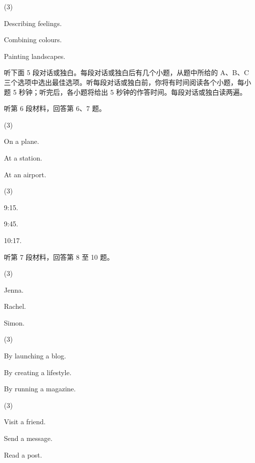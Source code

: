 \documentclass{英语试卷}
\begin{document}
\begin{choices}(3)
  \item Describing feelings.
  \item Combining colours.
  \item Painting landscapes.
\end{choices}
\par 听下面 5 段对话或独白。每段对话或独白后有几个小题，从题中所给的 A、B、C 三个选项中选出最佳选项。听每段对话或独白前，你将有时间阅读各个小题，每小题 5 秒钟；听完后，各小题将给出 5 秒钟的作答时间。每段对话或独白读两遍。\par
\par 听第 6 段材料，回答第 6、7 题。\par
{}
\begin{choices}(3)
  \item On a plane.
  \item At a station.
  \item At an airport.
\end{choices}
\begin{choices}(3)
  \item 9:15.
  \item 9:45.
  \item 10:17.
\end{choices}
\par 听第 7 段材料，回答第 8 至 10 题。\par
{}
\begin{choices}(3)
  \item Jenna.
  \item Rachel.
  \item Simon.
\end{choices}
\begin{choices}(3)
  \item By launching a blog.
  \item By creating a lifestyle.
  \item By running a magazine.
\end{choices}
\begin{choices}(3)
  \item Visit a friend.
  \item Send a message.
  \item Read a post.
\end{choices}
\end{document}
